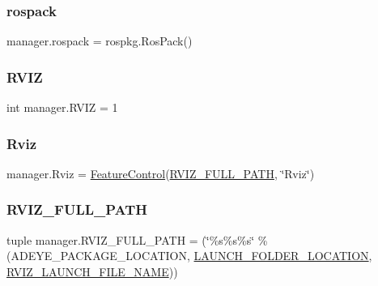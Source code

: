\mbox{\label{namespacemanager_af079b1840e898a44e8a8794f632c6747}} 
\subsubsection{\texorpdfstring{rospack}{rospack}}
{\footnotesize\ttfamily manager.\+rospack = rospkg.\+Ros\+Pack()}

\mbox{\label{namespacemanager_a00b72dc43f7bcfd7f320277e59b9d565}} 
\subsubsection{\texorpdfstring{R\+V\+IZ}{RVIZ}}
{\footnotesize\ttfamily int manager.\+R\+V\+IZ = 1}

\mbox{\label{namespacemanager_a2a89527ffbd1f9fa4d65bc9ed9ebf834}} 
\subsubsection{\texorpdfstring{Rviz}{Rviz}}
{\footnotesize\ttfamily manager.\+Rviz = \hyperlink{classFeatureControl_1_1FeatureControl}{Feature\+Control}(\hyperlink{namespacemanager_abec52dfb99cc7cf63fc7c9c112413570}{R\+V\+I\+Z\+\_\+\+F\+U\+L\+L\+\_\+\+P\+A\+TH}, \char`\"{}Rviz\char`\"{})}

\mbox{\label{namespacemanager_abec52dfb99cc7cf63fc7c9c112413570}} 
\subsubsection{\texorpdfstring{R\+V\+I\+Z\+\_\+\+F\+U\+L\+L\+\_\+\+P\+A\+TH}{RVIZ\_FULL\_PATH}}
{\footnotesize\ttfamily tuple manager.\+R\+V\+I\+Z\+\_\+\+F\+U\+L\+L\+\_\+\+P\+A\+TH = (\char`\"{}\%s\%s\%s\char`\"{} \% (A\+D\+E\+Y\+E\+\_\+\+P\+A\+C\+K\+A\+G\+E\+\_\+\+L\+O\+C\+A\+T\+I\+ON, \hyperlink{namespacemanager_aade405cb0881d91b45085d7bc0f392fa}{L\+A\+U\+N\+C\+H\+\_\+\+F\+O\+L\+D\+E\+R\+\_\+\+L\+O\+C\+A\+T\+I\+ON}, \hyperlink{namespacemanager_af8103724e7745859a07a898ea00a8dd0}{R\+V\+I\+Z\+\_\+\+L\+A\+U\+N\+C\+H\+\_\+\+F\+I\+L\+E\+\_\+\+N\+A\+ME}))}

